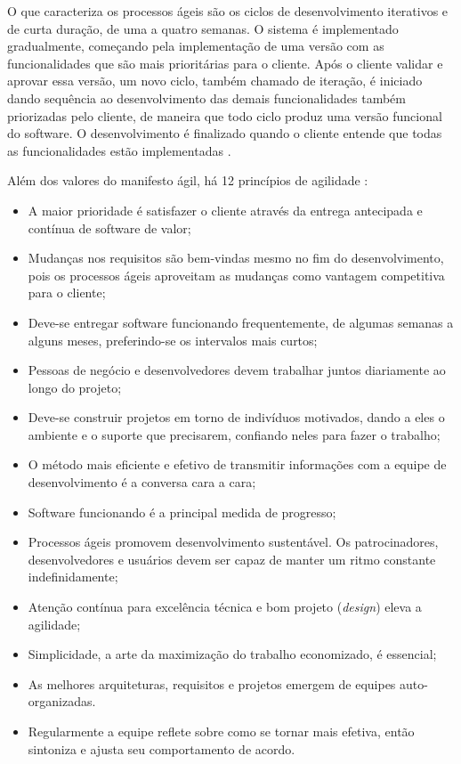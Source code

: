     O que caracteriza os processos ágeis são os ciclos de desenvolvimento iterativos e de curta duração, de uma a quatro semanas. O sistema é implementado gradualmente, começando pela implementação de uma versão com as funcionalidades que são mais prioritárias para o cliente. Após o cliente validar e aprovar essa versão, um novo ciclo, também chamado de iteração, é iniciado dando sequência ao desenvolvimento das demais funcionalidades também priorizadas pelo cliente, de maneira que todo ciclo produz uma versão funcional do software. O desenvolvimento é finalizado quando o cliente entende que todas as funcionalidades estão implementadas \cite{Valente2020}.
    
    Além dos valores do manifesto ágil, há 12 princípios de agilidade \cite{Pressman2015}:
    \begin{itemize}
        \item A maior prioridade é satisfazer o cliente através da entrega antecipada e contínua de software de valor;
        \item Mudanças nos requisitos são bem-vindas mesmo no fim do desenvolvimento, pois os processos ágeis aproveitam as mudanças como vantagem competitiva para o cliente;
        \item Deve-se entregar software funcionando frequentemente, de algumas semanas a alguns meses, preferindo-se os intervalos mais curtos;
        \item Pessoas de negócio e desenvolvedores devem trabalhar juntos diariamente ao longo do projeto;
        \item Deve-se construir projetos em torno de indivíduos motivados, dando a eles o ambiente e o suporte que precisarem, confiando neles para fazer o trabalho;
        \item O método mais eficiente e efetivo de transmitir informações com a equipe de desenvolvimento é a conversa cara a cara;
        \item Software funcionando é a principal medida de progresso;
        \item Processos ágeis promovem desenvolvimento sustentável. Os patrocinadores, desenvolvedores e usuários devem ser capaz de manter um ritmo constante indefinidamente;
        \item Atenção contínua para excelência técnica e bom projeto (\emph{design}) eleva a agilidade;
        \item Simplicidade, a arte da maximização do trabalho economizado, é essencial;
        \item As melhores arquiteturas, requisitos e projetos emergem de equipes auto-organizadas.
        \item Regularmente a equipe reflete sobre como se tornar mais efetiva, então sintoniza e ajusta seu comportamento de acordo.
    \end{itemize}
    
